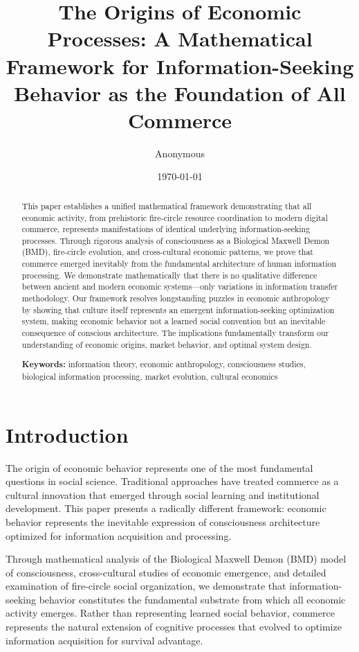 \documentclass[12pt,a4paper]{article}
\title{\textbf{The Origins of Economic Processes: A Mathematical Framework for Information-Seeking Behavior as the Foundation of All Commerce}}
\author{Anonymous}
\date{\today}
\begin{document}
\maketitle

\begin{abstract}
This paper establishes a unified mathematical framework demonstrating that all economic activity, from prehistoric fire-circle resource coordination to modern digital commerce, represents manifestations of identical underlying information-seeking processes. Through rigorous analysis of consciousness as a Biological Maxwell Demon (BMD), fire-circle evolution, and cross-cultural economic patterns, we prove that commerce emerged inevitably from the fundamental architecture of human information processing. We demonstrate mathematically that there is no qualitative difference between ancient and modern economic systems—only variations in information transfer methodology. Our framework resolves longstanding puzzles in economic anthropology by showing that culture itself represents an emergent information-seeking optimization system, making economic behavior not a learned social convention but an inevitable consequence of conscious architecture. The implications fundamentally transform our understanding of economic origins, market behavior, and optimal system design.

\textbf{Keywords:} information theory, economic anthropology, consciousness studies, biological information processing, market evolution, cultural economics
\end{abstract}

\section{Introduction}

The origin of economic behavior represents one of the most fundamental questions in social science. Traditional approaches have treated commerce as a cultural innovation that emerged through social learning and institutional development. This paper presents a radically different framework: economic behavior represents the inevitable expression of consciousness architecture optimized for information acquisition and processing.

Through mathematical analysis of the Biological Maxwell Demon (BMD) model of consciousness, cross-cultural studies of economic emergence, and detailed examination of fire-circle social organization, we demonstrate that information-seeking behavior constitutes the fundamental substrate from which all economic activity emerges. Rather than representing learned social behavior, commerce represents the natural extension of cognitive processes that evolved to optimize information acquisition for survival advantage.
\end{document}
